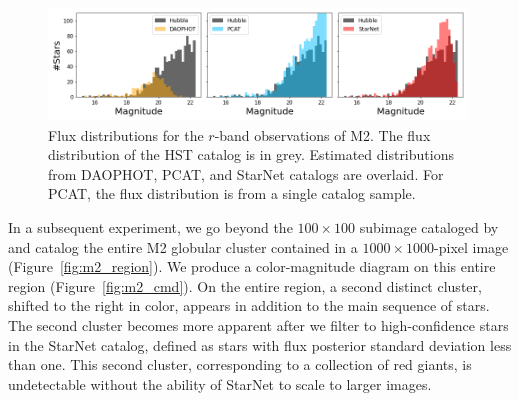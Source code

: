 
\begin{figure}[tb]
    \centering
    \includegraphics[width=0.99\textwidth]{figures/m2_results/luminosity_fun.png}
    \caption{Flux distributions for the $r$-band observations of M2.
    The flux distribution of the HST catalog is in grey.
    Estimated distributions from DAOPHOT, PCAT, and StarNet catalogs are overlaid.
    For PCAT, the flux distribution is from a single catalog sample. }
    \label{fig:luminosity_fun_m2}
\end{figure}




In a subsequent experiment, 
we go beyond the $100\times100$ subimage
cataloged by \cite{Feder_2019} and 
catalog the entire M2 globular cluster 
contained in a $1000 \times 1000$-pixel image (Figure~\ref{fig:m2_region}). 
We produce a color-magnitude diagram on this entire region (Figure~\ref{fig:m2_cmd}). 
On the entire region, a second distinct cluster, 
shifted to the right in color, 
appears in addition to the main sequence of stars.
The second cluster becomes more apparent after we filter to high-confidence stars in the StarNet catalog, 
defined as stars with flux posterior standard deviation less than one. 
This second cluster, corresponding to a collection of red giants, 
is undetectable without the ability of StarNet to 
scale to larger images. 

